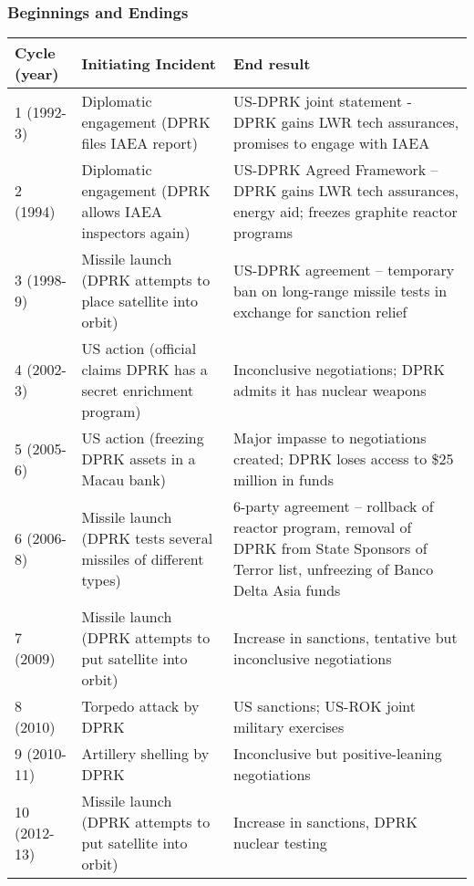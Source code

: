 \documentclass{article}
\begin{document}
\subsubsection{Beginnings and Endings}
\begin{tabular}{|l|p{6cm}|p{6cm}|}
	\hline
	Cycle (year) & Initiating Incident & End result \\ 
	\hline
	1 (1992-3) & Diplomatic engagement (DPRK files IAEA report) & US-DPRK joint statement - DPRK gains LWR tech assurances, promises to engage with IAEA \\ 
	\hline
	2 (1994) & Diplomatic engagement (DPRK allows IAEA inspectors again) & US-DPRK Agreed Framework – DPRK gains LWR tech assurances, energy aid; freezes graphite reactor programs \\ 
	\hline
	3 (1998-9) & Missile launch (DPRK attempts to place satellite into orbit) & US-DPRK agreement – temporary ban on long-range missile tests in exchange for sanction relief \\ 
	\hline
	4 (2002-3) & US action (official claims DPRK has a secret enrichment program) & Inconclusive negotiations; DPRK admits it has nuclear weapons \\ 
	\hline
	5 (2005-6) & US action (freezing DPRK assets in a Macau bank) & Major impasse to negotiations created; DPRK loses access to \$25 million in funds \\ 
	\hline
	6 (2006-8) & Missile launch (DPRK tests several missiles of different types) & 6-party agreement – rollback of reactor program, removal of DPRK from State Sponsors of Terror list, unfreezing of Banco Delta Asia funds \\ 
	\hline
	7 (2009) & Missile launch (DPRK attempts to put satellite into orbit) & Increase in sanctions, tentative but inconclusive negotiations \\ 
	\hline
	8 (2010) & Torpedo attack by DPRK & US sanctions; US-ROK joint military exercises \\ 
	\hline
	9 (2010-11) & Artillery shelling by DPRK & Inconclusive but positive-leaning negotiations \\ 
	\hline
	10 (2012-13) & Missile launch (DPRK attempts to put satellite into orbit) & Increase in sanctions, DPRK nuclear testing \\
	\hline
	\end{tabular}
\end{document}
